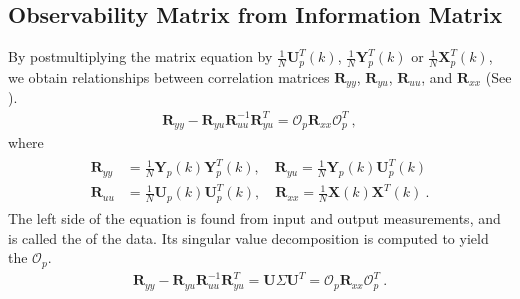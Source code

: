 \documentclass[letterpaper,10pt,english]{sphinxmanual}
\begin{document}
\subsection{Observability Matrix from Information Matrix}
\label{\detokenize{theory/srim:observability-matrix-from-information-matrix}}
\sphinxAtStartPar
By post\sphinxhyphen{}multiplying the matrix equation by
\(\frac{1}{N}\mathbf{U}_{p}^{T}(k)\),
\(\frac{1}{N}\mathbf{Y}_{p}^{T}(k)\) or
\(\frac{1}{N}\mathbf{X}_{p}^{T}(k)\), we obtain relationships
between correlation matrices \(\mathbf{R}_{yy}\),
\(\mathbf{R}_{yu}\), \(\mathbf{R}_{uu}\), and
\(\mathbf{R}_{xx}\) (See
{\hyperref[\detokenize{theory/srim:appendix-manipulation-of-discrete-time-system-matrix-equation-into-correlation-matrix-relationships}]{}}).
\begin{equation*}
\begin{split}\mathbf{R}_{yy} - \mathbf{R}_{yu}\mathbf{R}_{uu}^{-1}\mathbf{R}_{yu}^{T} = \mathcal{O}_{p}\mathbf{R}_{xx}\mathcal{O}_{p}^{T} ~,\end{split}
\end{equation*}
\sphinxAtStartPar
where
\begin{equation*}
\begin{split}\begin{aligned}
\mathbf{R}_{yy} &= \frac{1}{N}\mathbf{Y}_{p}(k)\mathbf{Y}_{p}^{T}(k), \quad{}
\mathbf{R}_{yu} = \frac{1}{N}\mathbf{Y}_{p}(k)\mathbf{U}_{p}^{T}(k) \\
\mathbf{R}_{uu} &= \frac{1}{N}\mathbf{U}_{p}(k)\mathbf{U}_{p}^{T}(k) , \quad{}
\mathbf{R}_{xx} = \frac{1}{N}\mathbf{X}(k)\mathbf{X}^{T}(k) ~.
\end{aligned}\end{split}
\end{equation*}
\sphinxAtStartPar
The left side of the equation is found from input and output
measurements, and is called the  of the data. Its
singular value decomposition is computed to yield the  \(\mathcal{O}_{p}\).
\begin{equation*}
\begin{split}\mathbf{R}_{yy} - \mathbf{R}_{yu}\mathbf{R}_{uu}^{-1}\mathbf{R}_{yu}^{T} = \mathbf{U} \Sigma \mathbf{U}^{T} = \mathcal{O}_{p}\mathbf{R}_{xx}\mathcal{O}_{p}^{T} ~.\end{split}
\end{equation*}
\end{document}
